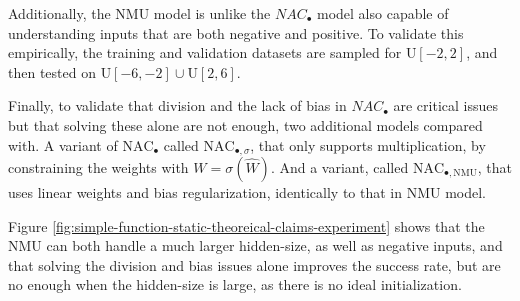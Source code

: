 Additionally, the NMU model is unlike the $NAC_{\bullet}$ model also capable of understanding inputs that are both negative and positive. To validate this empirically, the training and validation datasets are sampled for $\mathrm{U}[-2,2]$, and then tested on $\mathrm{U}[-6,-2] \cup \mathrm{U}[2,6]$.

Finally, to validate that division and the lack of bias in $NAC_{\bullet}$ are critical issues but that solving these alone are not enough, two additional models compared with. A variant of $\mathrm{NAC}_{\bullet}$ called $\mathrm{NAC}_{\bullet, \sigma}$, that only supports multiplication, by constraining the weights with $W = \sigma(\hat{W})$. And a variant, called $\mathrm{NAC}_{\bullet, \mathrm{NMU}}$, that uses linear weights and bias regularization, identically to that in NMU model.

Figure \ref{fig:simple-function-static-theoreical-claims-experiment} shows that the NMU can both handle a much larger hidden-size, as well as negative inputs, and that solving the division and bias issues alone improves the success rate, but are no enough when the hidden-size is large, as there is no ideal initialization.

